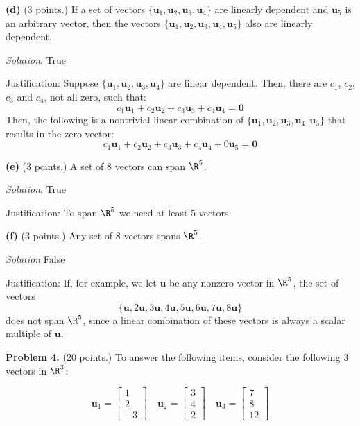 \documentclass[12pt]{article}
\begin{document}
\textbf{(d)} (3 points.) If a set of vectors $\{\mathbf{u}_1,\mathbf{u}_2,\mathbf{u}_3,\mathbf{u}_4\}$ are linearly dependent and $\mathbf{u}_5$ is an arbitrary vector, then the vectors  $\{\mathbf{u}_1,\mathbf{u}_2,\mathbf{u}_3,\mathbf{u}_4,\mathbf{u}_5\}$ also are linearly dependent.

\emph{Solution}. True

Justification: Suppose $\{\mathbf{u}_1,\mathbf{u}_2,\mathbf{u}_3,\mathbf{u}_4\}$ are linear dependent. Then, there are $c_1$, $c_2$, $c_3$ and $c_4$, not all zero, such that:
\[
c_1\mathbf{u}_1+c_2\mathbf{u}_2+c_3\mathbf{u}_3+c_4\mathbf{u}_4=\mathbf{0}
\]
Then, the following is a nontrivial linear combination of $\{\mathbf{u}_1,\mathbf{u}_2,\mathbf{u}_3,\mathbf{u}_4,\mathbf{u}_5\}$ that results in the zero vector:
\[
c_1\mathbf{u}_1+c_2\mathbf{u}_2+c_3\mathbf{u}_3+c_4\mathbf{u}_4+0\mathbf{u}_5=\mathbf{0}
\]

\textbf{(e)} (3 points.) A set of 8 vectors can span $\R^5$.

\emph{Solution}. True

Justification: To span $\R^5$ we need at least 5 vectors.

\textbf{(f)} (3 points.) Any set of 8 vectors spans $\R^5$.

\emph{Solution} False

Justification: If, for example, we let $\mathbf{u}$ be any nonzero vector in $\R^5$, the set of vectors 
\[\{\mathbf{u},2\mathbf{u},3\mathbf{u},4\mathbf{u},5\mathbf{u},6\mathbf{u},7\mathbf{u},8\mathbf{u}\}\]
does not span $\R^5$, since a linear combination of these vectors is always a scalar multiple of $\mathbf{u}$.

\clearpage

\textbf{Problem 4.} (20 points.) To answer the following items, consider the following 3 vectors in $\R^3$:

\[
\textbf{u}_1=\left[\begin{matrix}  1 \\ 2\\ -3\end{matrix}\right]\quad
\textbf{u}_2=\left[\begin{matrix}  3 \\ 4\\  2\end{matrix}\right]\quad
\textbf{u}_3=\left[\begin{matrix} 7 \\ 8\\  12\end{matrix}\right]
\]
\end{document}
